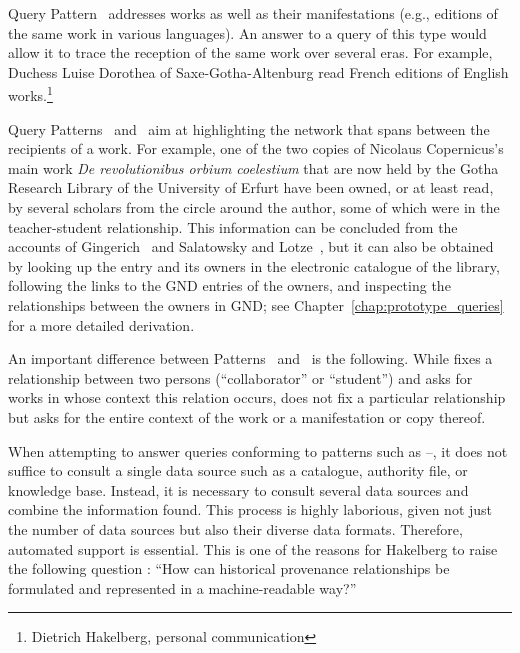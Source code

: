Query Pattern~ addresses works as well as their manifestations
(e.g., editions of the same work in various languages).
An answer to a query of this type would allow it to trace the reception
of the same work over several eras. For example, Duchess Luise Dorothea of Saxe-Gotha-Altenburg
read French editions of English works.\footnote{Dietrich Hakelberg, personal communication}

Query Patterns~ and~
aim at highlighting the network
that spans between the recipients of a work.
For example, one of the two copies of Nicolaus Copernicus's
main work \emph{De revolutionibus orbium coelestium} \autocite{Kopernikus1543}
that are now held by the Gotha Research Library of the University of Erfurt
have been owned, or at least read, by several scholars
from the circle around the author,
some of which were in the teacher-student relationship.
This information can be concluded
from the accounts of Gingerich~\autocite[p.\,69]{Gingerich2002}
and Salatowsky and Lotze~\autocite[p.\,142]{Salatowsky2015},
but it can also be obtained by looking up the entry and its owners in the electronic catalogue of the library,
following the links to the GND entries of the owners,
and inspecting the relationships between the owners in GND;
see Chapter~\ref{chap:prototype_queries} for a more detailed derivation.

An important difference between Patterns~ and~ is the following.
While  fixes a relationship between two persons (\enquote{collaborator} or \enquote{student})
and asks for works in whose context this relation occurs,
 does not fix a particular relationship but asks for the entire context of
the work or a manifestation or copy thereof.

When attempting to answer queries conforming to patterns such as --,
it does not suffice to consult a single data source such as
a catalogue, authority file, or knowledge base.
Instead, it is necessary to consult several data sources
and combine the information found. This process is highly laborious,
given not just the number of data sources but also their diverse
data formats. Therefore, automated support is essential.
This is one of the reasons for Hakelberg
to raise the following question \autocite[p.\,46, translated from German]{Hakelberg2016}:
\enquote{How can historical provenance relationships be formulated and represented
in a machine-readable way?}

